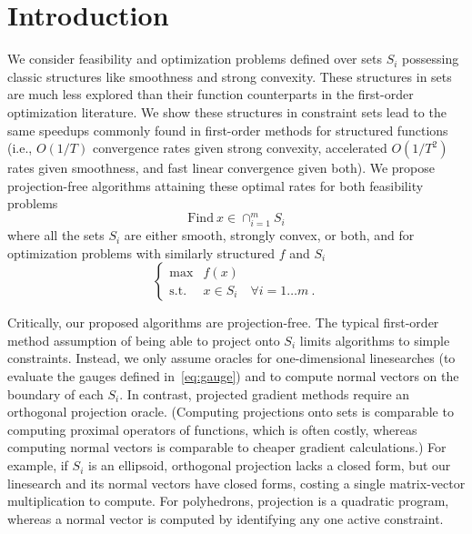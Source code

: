 \documentclass[sn-mathphys,Numbered]{sn-jnl}%
\begin{document}
\section{Introduction}

We consider feasibility and optimization problems defined over sets $S_i$ possessing classic structures like smoothness and strong convexity. These structures in sets are much less explored than their function counterparts in the first-order optimization literature. We show these structures in constraint sets lead to the same speedups commonly found in first-order methods for structured functions (i.e., $O(1/T)$ convergence rates given strong convexity, accelerated $O(1/T^2)$ rates given smoothness, and fast linear convergence given both). We propose projection-free algorithms attaining these optimal rates for both feasibility problems
\begin{equation} \label{eq:Feas-Problem}
    \mathrm{Find\ } x\in\cap_{i=1}^m S_i
\end{equation}
where all the sets $S_i$ are either smooth, strongly convex, or both, and for optimization problems with similarly structured $f$ and $S_i$
\begin{equation} \label{eq:OPT-Problem}
    \begin{cases}
        \max& f(x)\\
        \mathrm{s.t.} & x\in S_i \quad \forall i=1\dots m \ .
    \end{cases}
\end{equation}

Critically, our proposed algorithms are projection-free. The typical first-order method assumption of being able to project onto $S_i$ limits algorithms to simple constraints. Instead, we only assume oracles for one-dimensional linesearches (to evaluate the gauges defined in~\eqref{eq:gauge}) and to compute normal vectors on the boundary of each $S_i$. In contrast, projected gradient methods require an orthogonal projection oracle. (Computing projections onto sets is comparable to computing proximal operators of functions, which is often costly, whereas computing normal vectors is comparable to cheaper gradient calculations.) For example, if $S_i$ is an ellipsoid, orthogonal projection lacks a closed form, but our linesearch and its normal vectors have closed forms, costing a single matrix-vector multiplication to compute. For polyhedrons, projection is a quadratic program, whereas a normal vector is computed by identifying any one active constraint.
\end{document}
